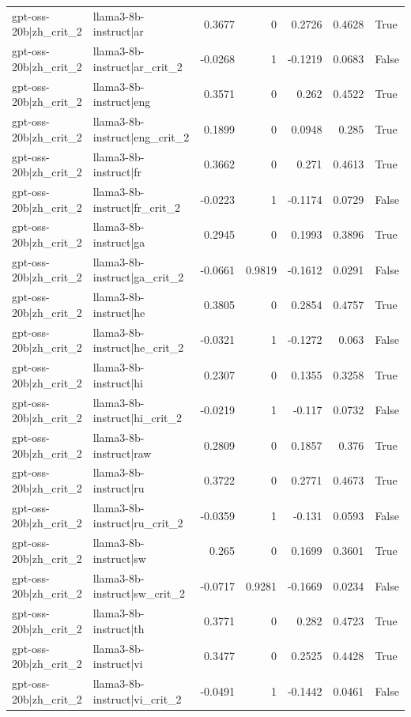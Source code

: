 \begin{table}
\begin{tabular}{l l r r r r l}
gpt-oss-20b|zh_crit_2 & llama3-8b-instruct|ar & 0.3677 & 0 & 0.2726 & 0.4628 & True \\
gpt-oss-20b|zh_crit_2 & llama3-8b-instruct|ar_crit_2 & -0.0268 & 1 & -0.1219 & 0.0683 & False \\
gpt-oss-20b|zh_crit_2 & llama3-8b-instruct|eng & 0.3571 & 0 & 0.262 & 0.4522 & True \\
gpt-oss-20b|zh_crit_2 & llama3-8b-instruct|eng_crit_2 & 0.1899 & 0 & 0.0948 & 0.285 & True \\
gpt-oss-20b|zh_crit_2 & llama3-8b-instruct|fr & 0.3662 & 0 & 0.271 & 0.4613 & True \\
gpt-oss-20b|zh_crit_2 & llama3-8b-instruct|fr_crit_2 & -0.0223 & 1 & -0.1174 & 0.0729 & False \\
gpt-oss-20b|zh_crit_2 & llama3-8b-instruct|ga & 0.2945 & 0 & 0.1993 & 0.3896 & True \\
gpt-oss-20b|zh_crit_2 & llama3-8b-instruct|ga_crit_2 & -0.0661 & 0.9819 & -0.1612 & 0.0291 & False \\
gpt-oss-20b|zh_crit_2 & llama3-8b-instruct|he & 0.3805 & 0 & 0.2854 & 0.4757 & True \\
gpt-oss-20b|zh_crit_2 & llama3-8b-instruct|he_crit_2 & -0.0321 & 1 & -0.1272 & 0.063 & False \\
gpt-oss-20b|zh_crit_2 & llama3-8b-instruct|hi & 0.2307 & 0 & 0.1355 & 0.3258 & True \\
gpt-oss-20b|zh_crit_2 & llama3-8b-instruct|hi_crit_2 & -0.0219 & 1 & -0.117 & 0.0732 & False \\
gpt-oss-20b|zh_crit_2 & llama3-8b-instruct|raw & 0.2809 & 0 & 0.1857 & 0.376 & True \\
gpt-oss-20b|zh_crit_2 & llama3-8b-instruct|ru & 0.3722 & 0 & 0.2771 & 0.4673 & True \\
gpt-oss-20b|zh_crit_2 & llama3-8b-instruct|ru_crit_2 & -0.0359 & 1 & -0.131 & 0.0593 & False \\
gpt-oss-20b|zh_crit_2 & llama3-8b-instruct|sw & 0.265 & 0 & 0.1699 & 0.3601 & True \\
gpt-oss-20b|zh_crit_2 & llama3-8b-instruct|sw_crit_2 & -0.0717 & 0.9281 & -0.1669 & 0.0234 & False \\
gpt-oss-20b|zh_crit_2 & llama3-8b-instruct|th & 0.3771 & 0 & 0.282 & 0.4723 & True \\
gpt-oss-20b|zh_crit_2 & llama3-8b-instruct|vi & 0.3477 & 0 & 0.2525 & 0.4428 & True \\
gpt-oss-20b|zh_crit_2 & llama3-8b-instruct|vi_crit_2 & -0.0491 & 1 & -0.1442 & 0.0461 & False \\

\end{tabular}
\end{table}
